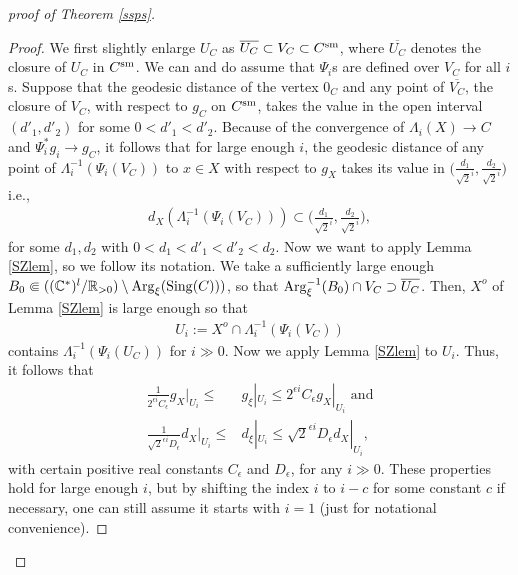 \documentclass[12pt,a4paper]{amsart}
\theoremstyle{remark}
\theoremstyle{definition}
\def\R{\mathbb{R}}
\def\C{\mathbb{C}}
\begin{document}
\begin{proof}[proof of Theorem \ref{ssps}]
\begin{proof}
We first slightly enlarge $U_C$ as 
$\overline{U_C}\subset V_C\subset C^{\rm sm}$, 
where $\overline{U_C}$ denotes the closure of 
$U_C$ in $C^{\rm sm}$. We can and do assume that 
$\Psi_i$s are defined over $V_C$ for all $i$s. 
Suppose that the geodesic distance of the vertex $0_C$ and any point of 
$\overline{V_C}$, the closure of $V_C$, 
with respect to $g_C$ on $C^{\rm sm}$, 
takes the value in the open interval $(d'_1,d'_2)$ for some $0<d'_1<d'_2$. 
Because of the convergence of $\Lambda_i(X)\to C$ and $\Psi_i^*g_i\to g_C$, 
it follows that for large enough $i$, 
the geodesic distance of any point of 
$\Lambda_i^{-1}(\Psi_i(V_C))$ to $x\in X$ with respect to $g_X$ 
takes its value in $\bigl(\frac{d_1}{\sqrt{2}^i}, \frac{d_2}{\sqrt{2}^i}\bigr)$ i.e., 
\begin{align}\label{diam.bd}
d_X(\Lambda_i^{-1}(\Psi_i(V_C)))\subset \bigl(\frac{d_1}{\sqrt{2}^i}, \frac{d_2}{\sqrt{2}^i}\bigr), 
\end{align}
for some $d_1,d_2$ with $0<d_1<d'_1<d'_2<d_2$. 
Now we want to apply Lemma \ref{SZlem}, so we follow its notation. 
We take a sufficiently large enough $B_0\Subset((\C^*)^l/\R_{>0})\setminus 
{\rm Arg}_{\xi}({\rm Sing}(C)))$, 
so that ${\rm Arg}_{\xi}^{-1}(B_0)\cap V_C\supset 
\overline{U_C}$. 
Then, 
$X^o$ of Lemma \ref{SZlem} is large enough so that 
\begin{align}\label{Uidef}
U_i:=X^o\cap \Lambda_i^{-1}(\Psi_i(V_C))   
\end{align}
contains $\Lambda_i^{-1}(\Psi_i(U_C))$ for $i\gg 0$. 
Now we apply Lemma \ref{SZlem} to $U_i$. 
Thus, it follows that 
\begin{align}
\label{met.comp2}    \frac{1}{2^{\epsilon i} C_{\epsilon}} g_X|_{U_i}
\le &g_\xi|_{U_i}
\le 2^{\epsilon i}C_{\epsilon} g_X|_{U_i} \text{ and} \\ 
\label{dist.comp2}   \frac{1}{\sqrt{2}^{\epsilon i} D_{\epsilon}} d_X|_{U_i}
\le &d_\xi|_{U_i}
\le \sqrt{2}^{\epsilon i}D_{\epsilon} d_X|_{U_i}, 
\end{align}
with certain positive real constants $C_{\epsilon}$ and $D_\epsilon$, 
for any $i\gg 0$. 
These properties hold for large enough $i$, 
but by shifting the index $i$ to $i-c$ for some constant 
$c$ 
if necessary, one can still assume it starts with $i=1$ 
(just for notational convenience). 


\end{proof}
\end{proof}
\end{document}
